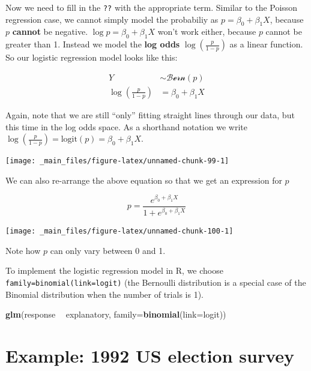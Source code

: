 \documentclass[]{book}
\newenvironment{Shaded}{\begin{snugshade}}{\end{snugshade}}
\newcommand{\KeywordTok}[1]{\textcolor[rgb]{0.13,0.29,0.53}{\textbf{#1}}}
\newcommand{\DataTypeTok}[1]{\textcolor[rgb]{0.13,0.29,0.53}{#1}}
\newcommand{\StringTok}[1]{\textcolor[rgb]{0.31,0.60,0.02}{#1}}
\newcommand{\OperatorTok}[1]{\textcolor[rgb]{0.81,0.36,0.00}{\textbf{#1}}}
\newcommand{\NormalTok}[1]{#1}
\theoremstyle{definition}
\theoremstyle{definition}
\theoremstyle{definition}
\theoremstyle{remark}
\begin{document}
Now we need to fill in the \texttt{??} with the appropriate term.
Similar to the Poisson regression case, we cannot simply model the
probabiliy as \(p = \beta_0 + \beta_1X\), because \(p\) \textbf{cannot}
be negative. \(\log{p} = \beta_0 + \beta_1X\) won't work either, because
\(p\) cannot be greater than 1. Instead we model the \textbf{log odds}
\(\log\left(\frac{p}{1 - p}\right)\) as a linear function. So our
logistic regression model looks like this:

\[
\begin{aligned}
Y  & \sim \mathcal{Bern}(p)\\
\log\left(\frac{p}{1 - p}\right) &  = \beta_0 + \beta_1 X
\end{aligned}
\]

Again, note that we are still ``only'' fitting straight lines through
our data, but this time in the log odds space. As a shorthand notation
we write
\(\log\left(\frac{p}{1 - p}\right) = \text{logit}(p) = \beta_0 + \beta_1 X\).

\begin{center}\texttt{[image: \_main\_files/figure-latex/unnamed-chunk-99-1]} \end{center}

We can also re-arrange the above equation so that we get an expression
for \(p\)

\[
p = \frac{e^{\beta_0 + \beta_1 X}}{1 + e^{\beta_0 + \beta_1 X}}
\]

\begin{center}\texttt{[image: \_main\_files/figure-latex/unnamed-chunk-100-1]} \end{center}

Note how \(p\) can only vary between 0 and 1.

To implement the logistic regression model in R, we choose
\texttt{family=binomial(link=logit)} (the Bernoulli distribution is a
special case of the Binomial distribution when the number of trials is
1).

\begin{Shaded}
\begin{Highlighting}[]
\KeywordTok{glm}\NormalTok{(response }\OperatorTok{~}\StringTok{ }\NormalTok{explanatory, }\DataTypeTok{family=}\KeywordTok{binomial}\NormalTok{(}\DataTypeTok{link=}\NormalTok{logit))}
\end{Highlighting}
\end{Shaded}

\section{Example: 1992 US election
survey}\label{example-1992-us-election-survey}
\end{document}
